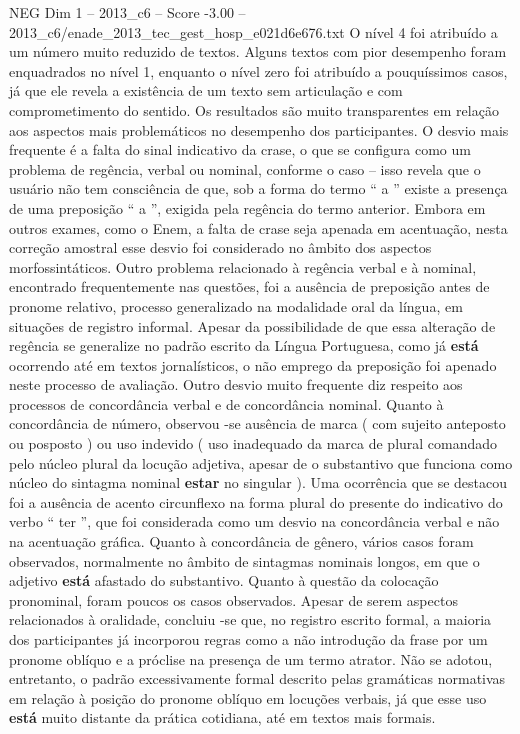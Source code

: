 \begin{textsample}{NEG Dim 1 – 2013\_c6 – Score -3.00 – 2013\_c6/enade\_2013\_tec\_gest\_hosp\_e021d6e676.txt}
O nível 4 foi atribuído a um número muito reduzido de textos.
Alguns textos com pior desempenho foram enquadrados no nível 1, enquanto o nível zero foi atribuído a pouquíssimos casos, já que ele revela a existência de um texto sem articulação e com comprometimento do sentido.
Os resultados são muito transparentes em relação aos aspectos mais problemáticos no desempenho dos participantes.
O desvio mais frequente é a falta do sinal indicativo da crase, o que se configura como um problema de regência, verbal ou nominal, conforme o caso – isso revela que o usuário não tem consciência de que, sob a forma do termo “ a ” existe a presença de uma preposição “ a ”, exigida pela regência do termo anterior.
Embora em outros exames, como o Enem, a falta de crase seja apenada em acentuação, nesta correção amostral esse desvio foi considerado no âmbito dos aspectos morfossintáticos.
Outro problema relacionado à regência verbal e à nominal, encontrado frequentemente nas questões, foi a ausência de preposição antes de pronome relativo, processo generalizado na modalidade oral da língua, em situações de registro informal.
Apesar da possibilidade de que essa alteração de regência se generalize no padrão escrito da Língua Portuguesa, como já \textbf{está} ocorrendo até em textos jornalísticos, o não emprego da preposição foi apenado neste processo de avaliação.
Outro desvio muito frequente diz respeito aos processos de concordância verbal e de concordância nominal.
Quanto à concordância de número, observou -se ausência de marca ( com sujeito anteposto ou posposto ) ou uso indevido ( uso inadequado da marca de plural comandado pelo núcleo plural da locução adjetiva, apesar de o substantivo que funciona como núcleo do sintagma nominal \textbf{estar} no singular ).
Uma ocorrência que se destacou foi a ausência de acento circunflexo na forma plural do presente do indicativo do verbo “ ter ”, que foi considerada como um desvio na concordância verbal e não na acentuação gráfica.
Quanto à concordância de gênero, vários casos foram observados, normalmente no âmbito de sintagmas nominais longos, em que o adjetivo \textbf{está} afastado do substantivo.
Quanto à questão da colocação pronominal, foram poucos os casos observados.
Apesar de serem aspectos relacionados à oralidade, concluiu -se que, no registro escrito formal, a maioria dos participantes já incorporou regras como a não introdução da frase por um pronome oblíquo e a próclise na presença de um termo atrator.
Não se adotou, entretanto, o padrão excessivamente formal descrito pelas gramáticas normativas em relação à posição do pronome oblíquo em locuções verbais, já que esse uso \textbf{está} muito distante da prática cotidiana, até em textos mais formais.

\end{textsample}
